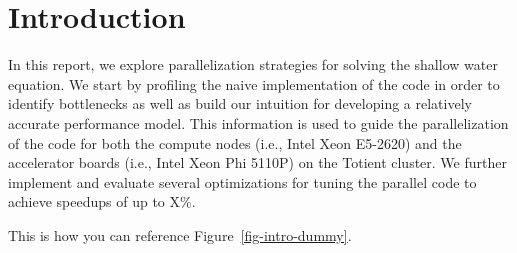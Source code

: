 
\section{Introduction}
\label{sec-intro}



In this report, we explore parallelization strategies for solving the
shallow water equation. We start by profiling the naive implementation of
the code in order to identify bottlenecks as well as build our intuition
for developing a relatively accurate performance model. This information
is used to guide the parallelization of the code for both the compute
nodes (i.e., Intel Xeon E5-2620) and the accelerator boards (i.e., Intel
Xeon Phi 5110P) on the Totient cluster. We further implement and evaluate
several optimizations for tuning the parallel code to achieve speedups of
up to X\%.

This is how you can reference Figure~\ref{fig-intro-dummy}.
